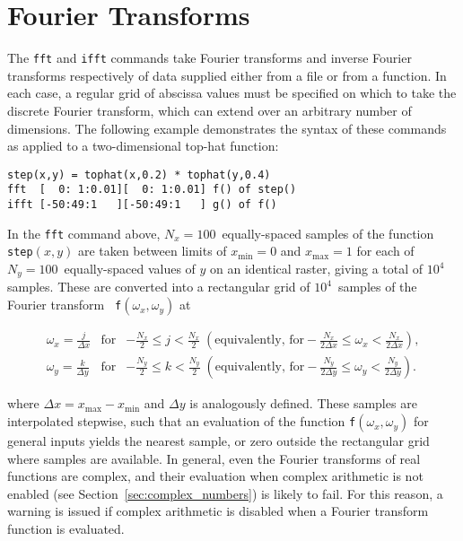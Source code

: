 \section{Fourier Transforms}

The {\tt fft} and {\tt ifft} commands take Fourier
transforms and inverse Fourier transforms respectively of data supplied either
from a file or from a function. In each case, a regular grid of abscissa values
must be specified on which to take the discrete Fourier transform, which can
extend over an arbitrary number of dimensions. The following example
demonstrates the syntax of these commands as applied to a two-dimensional
top-hat function:

\begin{verbatim}
step(x,y) = tophat(x,0.2) * tophat(y,0.4)
fft  [  0: 1:0.01][  0: 1:0.01] f() of step()
ifft [-50:49:1   ][-50:49:1   ] g() of f()
\end{verbatim}

\noindent In the {\tt fft} command above, $N_x=100$~equally-spaced samples of
the function {\tt step}$(x,y)$ are taken between limits of $x_\mathrm{min}=0$
and $x_\mathrm{max}=1$ for each of $N_y=100$~equally-spaced values of $y$ on an
identical raster, giving a total of $10^4$ samples. These are converted into a
rectangular grid of $10^4$~samples of the Fourier transform {\tt
f}$(\omega_x,\omega_y)$ at

\begin{eqnarray}
\omega_x = \frac{j}{\Delta x} & \textrm{for} & -\frac{N_x}{2}\leq j <\frac{N_x}{2} \; \left(\textrm{equivalently, for} -\frac{N_x}{2\Delta x}\leq \omega_x <\frac{N_x}{2\Delta x} \right), \nonumber \\
\omega_y = \frac{k}{\Delta y} & \textrm{for} & -\frac{N_y}{2}\leq k <\frac{N_y}{2} \; \left(\textrm{equivalently, for} -\frac{N_y}{2\Delta y}\leq \omega_y <\frac{N_y}{2\Delta y} \right). \nonumber
\end{eqnarray}

\noindent where $\Delta x=x_\mathrm{max}-x_\mathrm{min}$ and $\Delta y$ is
analogously defined. These samples are interpolated stepwise, such that an
evaluation of the function {\tt f}$(\omega_x,\omega_y)$ for general inputs
yields the nearest sample, or zero outside the rectangular grid where samples
are available. In general, even the Fourier transforms of real functions are
complex, and their evaluation when complex arithmetic is not enabled (see
Section~\ref{sec:complex_numbers}) is likely to fail. For this reason, a
warning is issued if complex arithmetic is disabled when a Fourier transform
function is evaluated.

